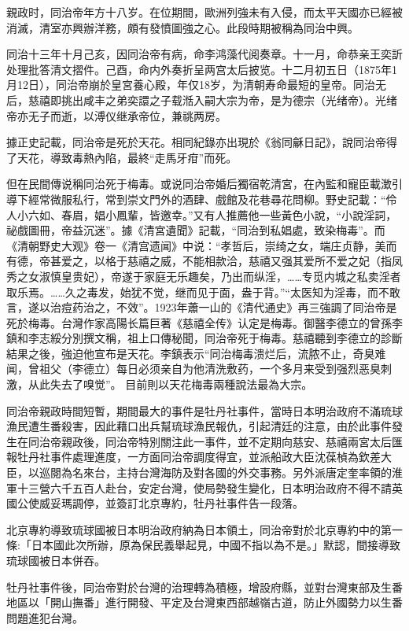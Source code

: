親政时，同治帝年方十八岁。在位期間，歐洲列強未有入侵，而太平天國亦已經被消滅，清室亦興辦洋務，頗有發憤圖強之心。此段時期被稱為同治中興。

同治十三年十月己亥，因同治帝有病，命李鸿藻代阅奏章。十一月，命恭亲王奕訢处理批答清文摺件。己酉，命内外奏折呈两宫太后披览。十二月初五日（1875年1月12日），同治帝崩於皇宮養心殿，年仅18岁，为清朝寿命最短的皇帝。同治无后，慈禧即挑出咸丰之弟奕譞之子载湉入嗣大宗为帝，是为德宗（光绪帝）。光绪帝亦无子而逝，以溥仪继承帝位，兼祧两房。

據正史記載，同治帝是死於天花。相同紀錄亦出現於《翁同龢日記》，說同治帝得了天花，導致毒熱內陷，最終“走馬牙疳”而死。

但在民間傳说稱同治死于梅毒。或说同治帝婚后獨宿乾清宮，在內監和寵臣載澂引導下經常微服私行，常到崇文門外的酒肆、戲館及花巷尋花問柳。野史記載：“伶人小六如、春眉，娼小鳳輩，皆邀幸。”又有人推薦他一些黃色小說，“小說淫詞，祕戲圖冊，帝益沉迷”。據《清宮遺聞》記載，“同治到私娼處，致染梅毒”。而《清朝野史大观》卷一《清宫遗闻》中说：“孝哲后，崇绮之女，端庄贞静，美而有德，帝甚爱之，以格于慈禧之威，不能相款洽，慈禧又强其爱所不爱之妃（指凤秀之女淑慎皇贵妃），帝遂于家庭无乐趣矣，乃出而纵淫，……专觅内城之私卖淫者取乐焉。……久之毒发，始犹不觉，继而见于面，盎于背。”“太医知为淫毒，而不敢言，遂以治痘药治之，不效”。1923年蕭一山的《清代通史》再三強調了同治帝是死於梅毒。台灣作家高陽长篇巨著《慈禧全传》认定是梅毒。御醫李德立的曾孫李鎮和李志綏分別撰文稱，祖上口傳秘聞，同治帝死于梅毒。慈禧聽到李德立的診斷結果之後，強迫他宣布是天花。李鎮表示“同治梅毒溃烂后，流脓不止，奇臭难闻，曾祖父（李德立）每日必须亲自为他清洗敷药，一个多月来受到强烈恶臭刺激，从此失去了嗅觉”。 目前則以天花梅毒兩種說法最為大宗。

同治帝親政時間短暫，期間最大的事件是牡丹社事件，當時日本明治政府不滿琉球漁民遭生番殺害，因此藉口出兵幫琉球漁民報仇，引起清廷的注意，由於此事件發生在同治帝親政後，同治帝特別關注此一事件，並不定期向慈安、慈禧兩宮太后匯報牡丹社事件處理進度，一方面同治帝調度得宜，並派船政大臣沈葆楨為欽差大臣，以巡閱為名來台，主持台灣海防及對各國的外交事務。另外派唐定奎率領的淮軍十三營六千五百人赴台，安定台灣，使局勢發生變化，日本明治政府不得不請英國公使威妥瑪調停，並簽訂北京專約，牡丹社事件告一段落。

北京專約導致琉球國被日本明治政府納為日本領土，同治帝對於北京專約中的第一條:「日本國此次所辦，原為保民義舉起見，中國不指以為不是。」默認，間接導致琉球國被日本併吞。

牡丹社事件後，同治帝對於台灣的治理轉為積極，增設府縣，並對台灣東部及生番地區以「開山撫番」進行開發、平定及台灣東西部越嶺古道，防止外國勢力以生番問題進犯台灣。

